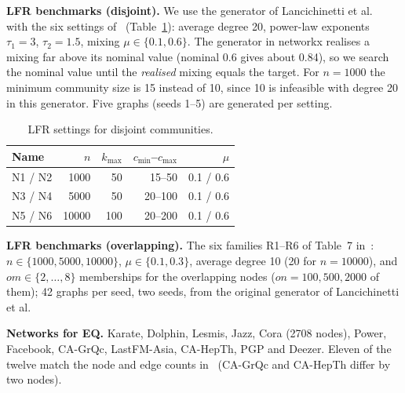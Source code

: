 \documentclass[conference]{IEEEtran}
\begin{document}
\textbf{LFR benchmarks (disjoint).} We use the generator of Lancichinetti et al.~\cite{lfr2008} with the six settings of~\cite{kong2026} (Table~\ref{tab:lfrparam}): average degree 20, power-law exponents $\tau_1=3$, $\tau_2=1.5$, mixing $\mu\in\{0.1,0.6\}$. The generator in networkx realises a mixing far above its nominal value (nominal 0.6 gives about 0.84), so we search the nominal value until the \emph{realised} mixing equals the target. For $n=1000$ the minimum community size is 15 instead of 10, since 10 is infeasible with degree 20 in this generator. Five graphs (seeds 1--5) are generated per setting.
\begin{table}[H]
\centering
\caption{LFR settings for disjoint communities.}
\label{tab:lfrparam}
\scriptsize
\begin{tabular}{lrrrr}
\toprule
Name & $n$ & $k_{\max}$ & $c_{\min}$--$c_{\max}$ & $\mu$ \\
\midrule
N1 / N2 & 1000 & 50 & 15--50 & 0.1 / 0.6 \\
N3 / N4 & 5000 & 50 & 20--100 & 0.1 / 0.6 \\
N5 / N6 & 10000 & 100 & 20--200 & 0.1 / 0.6 \\
\bottomrule
\end{tabular}
\end{table}

\textbf{LFR benchmarks (overlapping).} The six families R1--R6 of Table~7 in~\cite{kong2026}: $n\in\{1000,5000,10000\}$, $\mu\in\{0.1,0.3\}$, average degree 10 (20 for $n=10000$), and $om\in\{2,\dots,8\}$ memberships for the overlapping nodes ($on=100,500,2000$ of them); 42 graphs per seed, two seeds, from the original generator of Lancichinetti et al.

\textbf{Networks for EQ.} Karate, Dolphin, Lesmis, Jazz, Cora (2708 nodes), Power, Facebook, CA-GrQc, LastFM-Asia, CA-HepTh, PGP and Deezer. Eleven of the twelve match the node and edge counts in~\cite{kong2026} (CA-GrQc and CA-HepTh differ by two nodes).
\end{document}
